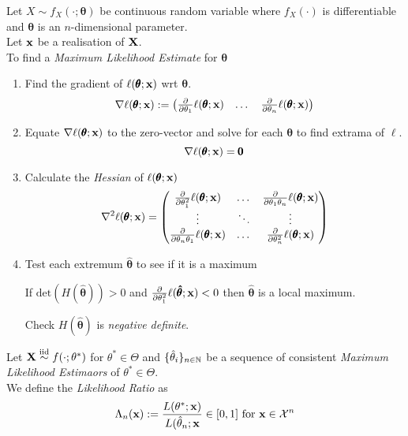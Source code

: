 \documentclass[11pt,a4paper]{article}
\begin{document}
Let $X\sim f_X(\cdot;\pmb\theta)$ be continuous random variable where $f_X(\cdot)$ is differentiable and $\pmb\theta$ is an $n$-dimensional parameter.\\
Let $\textbf{x}$ be a realisation of $\textbf{X}$.\\
To find a \textit{Maximum Likelihood Estimate} for $\pmb\theta$
\begin{enumerate}
	\item Find the gradient of $\ell(\pmb\theta;\textbf{x})$ wrt $\pmb\theta$.
	$$\nabla\ell(\pmb\theta;\textbf{x}):=\begin{pmatrix}\frac{\partial}{\partial\theta_1}\ell(\pmb\theta;\textbf{x})&\dots&\frac{\partial}{\partial\theta_n}\ell(\pmb\theta;\textbf{x})\end{pmatrix}$$
	\item Equate $\nabla\ell(\pmb\theta;\textbf{x})$ to the zero-vector and solve for each $\pmb\theta$ to find extrama of $\ell$.
	$$\nabla\ell(\pmb\theta;\textbf{x})=\pmb0$$
	\item Calculate the \textit{Hessian} of $\ell(\pmb\theta;\textbf{x})$
	$$\nabla^2\ell(\pmb\theta;\textbf{x})=\begin{pmatrix}\frac{\partial}{\partial\theta_1^2}\ell(\pmb\theta;\textbf{x})&\dots&\frac{\partial}{\partial\theta_1\theta_n}\ell(\pmb\theta;\textbf{x})\\\vdots&\ddots&\vdots\\\frac{\partial}{\partial\theta_n\theta_1}\ell(\pmb\theta;\textbf{x})&\dots&\frac{\partial}{\partial\theta_n^2}\ell(\pmb\theta;\textbf{x})\end{pmatrix}$$
	\item Test each extremum $\pmb{\hat\theta}$ to see if it is a maximum
\begin{center}If $\text{det}(H(\pmb{\hat\theta}))>0$ and $\frac{\partial}{\partial\theta_1^2}\ell(\pmb{\hat\theta};\textbf{x})<0$ then $\pmb{\hat\theta}$ is a local maximum.\end{center}
\ie Check $H(\pmb{\hat\theta})$ is \textit{negative definite}.\\
\end{enumerate}

Let $\textbf{X}\overset{\text{iid}}{\sim} f(\cdot;\theta^*)$ for $\theta^*\in\Theta$ and $\{\hat\theta_i\}_{n\in\mathbb{N}}$ be a sequence of consistent \textit{Maximum Likelihood Estimaors} of $\theta^*\in\Theta$.\\
We define the \textit{Likelihood Ratio} as
$$\Lambda_n(\textbf{x}):=\frac{L(\theta^*;\textbf{x})}{L(\hat\theta_n;\textbf{x}}\in[0,1]\text{ for }\textbf{x}\in\mathcal{X}^n$$
\end{document}
